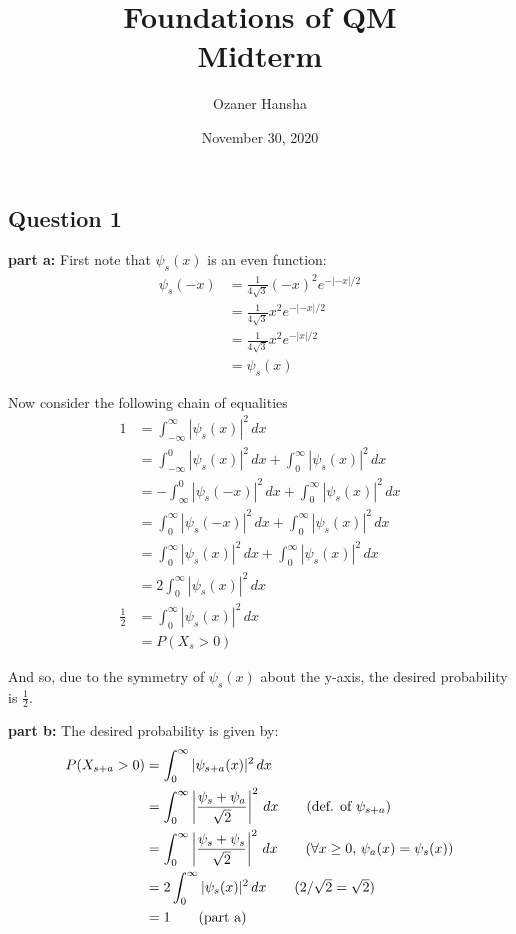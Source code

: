 \documentclass{article}
\begin{document}
\title{Foundations of QM\\ Midterm}
\author{Ozaner Hansha}
\date{November 30, 2020}
\maketitle

\subsection*{Question 1}
\noindent\textbf{part a:} First note that $\psi_s(x)$ is an even function:
\begin{align*}
    \psi_s(-x)&=\frac{1}{4\sqrt{3}}(-x)^2e^{-|-x|/2}\tag{def. of $\psi_s$}\\
    &=\frac{1}{4\sqrt{3}}x^2e^{-|-x|/2}\tag{$x^2=(-x)^2$}\\
    &=\frac{1}{4\sqrt{3}}x^2e^{-|x|/2}\tag{$|x|=|-x|$}\\
    &=\psi_s(x)\tag{def. of $\psi_s$}
\end{align*}

Now consider the following chain of equalities
\begin{align*}
    1&=\int_{-\infty}^\infty|\psi_s(x)|^2\,dx\tag{integral of a pdf over support is 1}\\
    &=\int_{-\infty}^0|\psi_s(x)|^2\,dx+\int_0^\infty|\psi_s(x)|^2\,dx\\
    &=-\int_{\infty}^0|\psi_s(-x)|^2\,dx+\int_0^{\infty}|\psi_s(x)|^2\,dx\tag{expansion of interval of integration by $-1$}\\
    &=\int^{\infty}_0|\psi_s(-x)|^2\,dx+\int_0^{\infty}|\psi_s(x)|^2\,dx\tag{reverse interval of integration}\\
    &=\int^{\infty}_0|\psi_s(x)|^2\,dx+\int_0^{\infty}|\psi_s(x)|^2\,dx\tag{$\psi_s$ is an even function}\\
    &=2\int^{\infty}_0|\psi_s(x)|^2\,dx\\
    \frac{1}{2}&=\int^{\infty}_0|\psi_s(x)|^2\,dx\\
    &=P(X_s>0)
\end{align*}

And so, due to the symmetry of $\psi_s(x)$ about the y-axis, the desired probability is $\frac{1}{2}$.
\bigskip

\noindent\textbf{part b:} The desired probability is given by:
\begin{align*}
    P(X_{s+a}>0)&=\int^{\infty}_0|\psi_{s+a}(x)|^2\,dx\\
    &=\int^{\infty}_0\left|\frac{\psi_s+\psi_a}{\sqrt{2}}\right|^2\,dx\tag{def. of $\psi_{s+a}$}\\
    &=\int^{\infty}_0\left|\frac{\psi_s+\psi_s}{\sqrt{2}}\right|^2\,dx\tag{$\forall x\ge0,\, \psi_a(x)=\psi_s(x)$}\\
    &=2\int^{\infty}_0|\psi_s(x)|^2\,dx\tag{$2/\sqrt{2}=\sqrt{2}$}\\
    &=1\tag{part a}
\end{align*}
\bigskip
\end{document}
